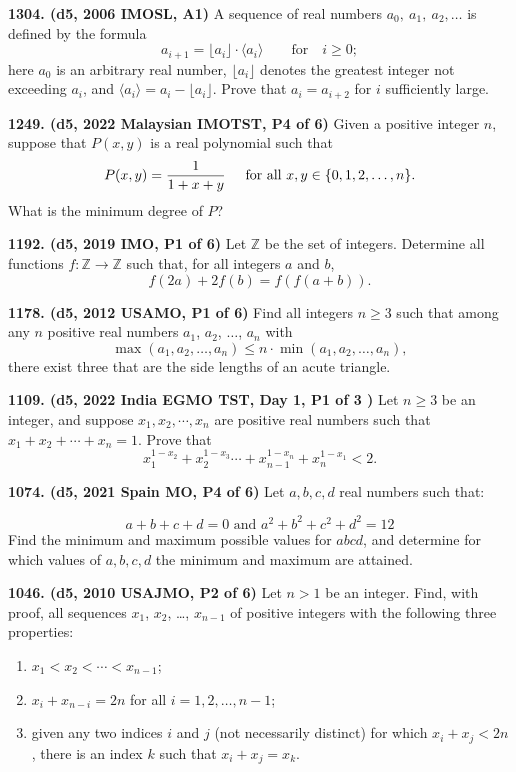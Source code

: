 \documentclass{article}
\begin{document}
\textbf{1304. (\color{red}d5\color{black}, 2006 IMOSL, A1)} A sequence of real numbers $ a_{0},\ a_{1},\ a_{2},\dots$ is defined by the formula
\[ a_{i + 1} = \lfloor a_{i}\rfloor\cdot \langle a_{i}\rangle\qquad\text{for}\quad i\geq 0;
\]here $a_0$ is an arbitrary real number, $\lfloor a_i\rfloor$ denotes the greatest integer not exceeding $a_i$, and $\langle a_i\rangle=a_i-\lfloor a_i\rfloor$. Prove that $a_i=a_{i+2}$ for $i$ sufficiently large.

\textbf{1249. (\color{red}d5\color{black}, 2022 Malaysian IMOTST, P4 of 6)} Given a positive integer $n$, suppose that $P(x,y)$ is a real polynomial such that
\[P(x,y)=\frac{1}{1+x+y} \hspace{0.5cm} \text{for all $x,y\in\{0,1,2,\dots,n\}$}.\] What is the minimum degree of $P$?

\textbf{1192. (\color{red}d5\color{black}, 2019 IMO, P1 of 6)} Let $\mathbb{Z}$ be the set of integers. Determine all functions $f : \mathbb{Z} \to \mathbb{Z}$ such that, for all integers $a$ and $b$,\[f(2a) + 2f(b) = f(f(a + b)).\]

\textbf{1178. (\color{red}d5\color{black}, 2012 USAMO, P1 of 6)} Find all integers $n \ge 3$ such that among any $n$ positive real numbers $a_1$, $a_2$, $\dots$, $a_n$ with \[\max(a_1, a_2, \dots, a_n) \le n \cdot \min(a_1, a_2, \dots, a_n),\] there exist three that are the side lengths of an acute triangle.

\textbf{1109. (\color{red}d5\color{black}, 2022 India EGMO TST, Day 1, P1 of 3 )} Let $n\ge 3$ be an integer, and suppose $x_1,x_2,\cdots ,x_n$ are positive real numbers such that $x_1+x_2+\cdots +x_n=1.$ Prove that$$x_1^{1-x_2}+x_2^{1-x_3}\cdots+x_{n-1}^{1-x_n}+x_n^{1-x_1}<2.$$

\textbf{1074. (\color{red}d5\color{black}, 2021 Spain MO, P4 of 6)} Let $a,b,c,d$ real numbers such that:

$$a+b+c+d=0 \text{ and } a^2+b^2+c^2+d^2 = 12$$
Find the minimum and maximum possible values for $abcd$, and determine for which values of $a,b,c,d$ the minimum and maximum are attained.

\textbf{1046. (\color{red}d5\color{black}, 2010 USAJMO, P2 of 6)} Let $n > 1$ be an integer.  Find, with proof, all sequences $x_1$, $x_2$, \dots, $x_{n-1}$ of positive integers with the following three properties: \begin{enumerate}
    \item $x_1 < x_2 < \cdots < x_{n-1}$;
    \item $x_i + x_{n-i} = 2n$ for all $i = 1, 2, \ldots , n - 1$;
    \item given any two indices $i$ and $j$ (not necessarily distinct)
          for which $x_i + x_j < 2n$,  there is an index $k$ such that $x_i + x_j = x_k$. \end{enumerate}
\end{document}
